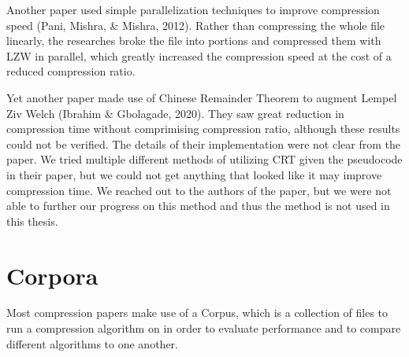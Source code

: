 \documentclass[12pt,twoside]{reedthesis}
\begin{document}
Another paper used simple parallelization techniques to improve compression speed (Pani, Mishra, \& Mishra, 2012). Rather than compressing the whole file linearly, the researches broke the file into portions and compressed them with LZW in parallel, which greatly increased the compression speed at the cost of a reduced compression ratio.

Yet another paper made use of Chinese Remainder Theorem to augment Lempel Ziv Welch (Ibrahim \& Gbolagade, 2020). They saw great reduction in compression time without comprimising compression ratio, although these results could not be verified. The details of their implementation were not clear from the paper. We tried multiple different methods of utilizing CRT given the pseudocode in their paper, but we could not get anything that looked like it may improve compression time. We reached out to the authors of the paper, but we were not able to further our progress on this method and thus the method is not used in this thesis.

\hypertarget{corpora}{%
\section{Corpora}\label{corpora}}

Most compression papers make use of a Corpus, which is a collection of files to run a compression algorithm on in order to evaluate performance and to compare different algorithms to one another.
\end{document}

